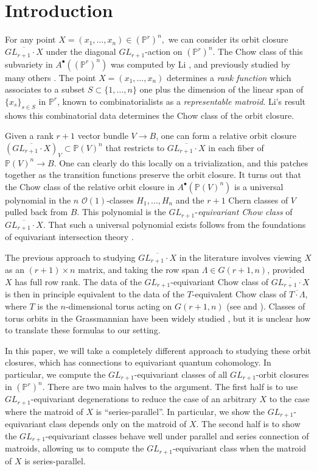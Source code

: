 \documentclass[12pt]{amsart}
\newcommand{\mb}{\mathbb}
\newcommand{\ol}{\overline}
\theoremstyle{plain}
\theoremstyle{definition}
\theoremstyle{remark}
\begin{document}
\section{Introduction}
For any point $X=(x_1,\ldots,x_n)\in(\mb{P}^r)^n,$ we can consider its orbit closure $\overline{GL_{r+1}\cdot X}$ under the diagonal $GL_{r+1}$-action on $(\mb{P}^r)^n$. The Chow class of this subvariety in $A^\bullet((\mb{P}^r)^n)$ was computed by Li \cite{Binglin}, and previously studied by many others \cite{AF93,AF00,Serdica,Kapranov}. The point $X=(x_1,\ldots,x_n)$ determines a \emph{rank function} which associates to a subset $S\subset \{1,\ldots,n\}$ one plus the dimension of the linear span of $\{x_s\}_{s \in S}$ in $\mb{P}^r$, known to combinatorialists as a \emph{representable matroid}. Li's result shows this combinatorial data determines the Chow class of the orbit closure. 

Given a rank $r+1$ vector bundle $V\to B$, one can form a relative orbit closure $(\ol{GL_{r+1}\cdot X})_V\subset \mb{P}(V)^n$ that restricts to $\overline{GL_{r+1}\cdot X}$ in each fiber of $\mb{P}(V)^n\to B$. One can clearly do this locally on a trivialization, and this patches together as the transition functions preserve the orbit closure. It turns out that the Chow class of the relative orbit closure in $A^{\bullet}(\mb{P}(V)^n)$ is a universal polynomial in the $n$ $\mathscr{O}(1)$-classes $H_1,\ldots,H_n$ and the $r+1$ Chern classes of $V$ pulled back from $B$. This polynomial is the $GL_{r+1}$-\emph{equivariant Chow class} of $\overline{GL_{r+1}\cdot X}$. That such a universal polynomial exists follows from the foundations of equivariant intersection theory \cite{EG98}.

The previous approach to studying $\overline{GL_{r+1}\cdot X}$ in the literature involves viewing $X$ as an $(r+1)\times n$ matrix, and taking the row span $\Lambda\in G(r+1,n)$, provided $X$ has full row rank. The data of the $GL_{r+1}$-equivariant Chow class of $\overline{GL_{r+1}\cdot X}$ is then in principle equivalent to the data of the $T$-equivalent Chow class of $\overline{T\cdot \Lambda}$, where $T$ is the $n$-dimensional torus acting on $G(r+1,n)$ (see \cite{Fink} and ). Classes of torus orbits in the Grassmannian have been widely studied \cite{Kapranov,SpeInvariant,FS12,berget:hal-01283166}, but it is unclear how to translate these formulas to our setting. 

In this paper, we will take a completely different approach to studying these orbit closures, which has connections to equivariant quantum cohomology. In particular, we compute the $GL_{r+1}$-equivariant classes of all $GL_{r+1}$-orbit closures in $(\mb{P}^r)^n$. There are two main halves to the argument. The first half is to use $GL_{r+1}$-equivariant degenerations to reduce the case of an arbitrary $X$ to the case where the matroid of $X$ is ``series-parallel''. In particular, we show the $GL_{r+1}$-equivariant class depends only on the matroid of $X$. The second half is to show the $GL_{r+1}$-equivariant classes behave well under parallel and series connection of matroids, allowing us to compute the $GL_{r+1}$-equivariant class when the matroid of $X$ is series-parallel. 
\end{document}
